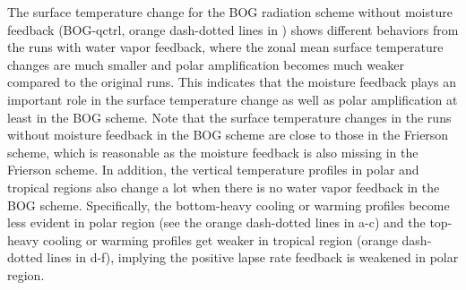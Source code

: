 
The surface temperature change for the BOG radiation scheme without moisture feedback (BOG-qctrl, orange dash-dotted lines in ) shows different behaviors from the runs with water vapor feedback, where the zonal mean surface temperature changes are much smaller and polar amplification becomes much weaker compared to the original runs. This indicates that the moisture feedback plays an important role in the surface temperature change as well as polar amplification at least in the BOG scheme. Note that the surface temperature changes in the runs without moisture feedback in the BOG scheme are close to those in the Frierson scheme, which is reasonable as the moisture feedback is also missing in the Frierson scheme. In addition, the vertical temperature profiles in polar and tropical regions also change a lot when there is no water vapor feedback in the BOG scheme. Specifically, the bottom-heavy cooling or warming profiles become less evident in polar region (see the orange dash-dotted lines in a-c) and the top-heavy cooling or warming profiles get weaker in tropical region (orange dash-dotted lines in d-f), implying the positive lapse rate feedback is weakened in polar region.


